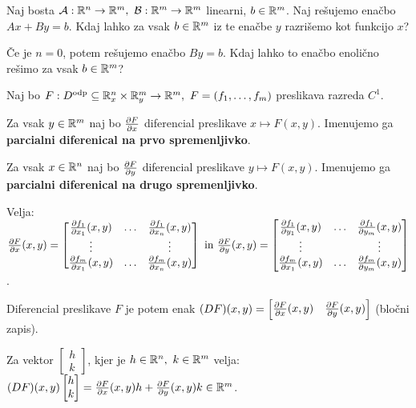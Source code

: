 \begin{primer}
    Naj bosta $\mathcal{A}: \mathbb{R}^n \to \mathbb{R}^m, \ \mathcal{B}: \mathbb{R}^m \to \mathbb{R}^m$ linearni, $b \in \mathbb{R}^m$. Naj rešujemo enačbo $Ax + By = b$. Kdaj lahko za vsak $b \in \mathbb{R}^m$ iz te  enačbe $y$ razrišemo kot funkcijo $x$? 

    Če je $n=0$, potem rešujemo enačbo $By = b$. Kdaj lahko to enačbo enolično rešimo za vsak $b \in \mathbb{R}^m$?
\end{primer}

Naj bo $F: D^\text{odp} \subseteq \mathbb{R}^n_x \times \mathbb{R}^m_y \to \mathbb{R}^m, \ F = (f_1, \ldots, f_m)$ preslikava razreda $C^1$. 

Za vsak $y \in \mathbb{R}^m$ naj bo $\frac{\partial F}{\partial x}$ diferencial preslikave $x \mapsto F(x,y)$. Imenujemo ga \textbf{parcialni diferenical na prvo spremenljivko}. 

Za vsak $x \in \mathbb{R}^n$ naj bo $\frac{\partial F}{\partial y}$ diferencial preslikave $y \mapsto F(x,y)$. Imenujemo ga \textbf{parcialni diferenical na drugo spremenljivko}. 

Velja: 
$\frac{\partial F}{\partial x}(x,y) = \begin{bmatrix}
    \frac{\partial f_1}{\partial x_1}(x,y) & \ldots & \frac{\partial f_1}{\partial x_n}(x,y) \\
    \vdots & & \vdots \\
    \frac{\partial f_m}{\partial x_1}(x,y) & \ldots & \frac{\partial f_m}{\partial x_n}(x,y) 
\end{bmatrix} \text{ in } \frac{\partial F}{\partial y}(x,y) = \begin{bmatrix}
    \frac{\partial f_1}{\partial y_1}(x,y) & \ldots & \frac{\partial f_1}{\partial y_m}(x,y) \\
    \vdots & & \vdots \\
    \frac{\partial f_m}{\partial x_1}(x,y) & \ldots & \frac{\partial f_m}{\partial y_m}(x,y) 
\end{bmatrix}$.

Diferencial preslikave $F$ je potem enak $(DF)(x,y) = \begin{bmatrix}
    \frac{\partial F}{\partial x}(x,y) & \frac{\partial F}{\partial y}(x,y)
\end{bmatrix}$ (bločni zapis).

\begin{opomba}
    Za vektor $\begin{bmatrix}
        h \\ k
    \end{bmatrix}$, kjer je $h \in \mathbb{R}^n, \ k \in \mathbb{R}^m$ velja: $(DF)(x,y)  \begin{bmatrix}
        h \\ k
    \end{bmatrix} = \frac{\partial F}{\partial x}(x,y)  h + \frac{\partial F}{\partial y}(x,y)  k \in \mathbb{R}^m$.
\end{opomba}

